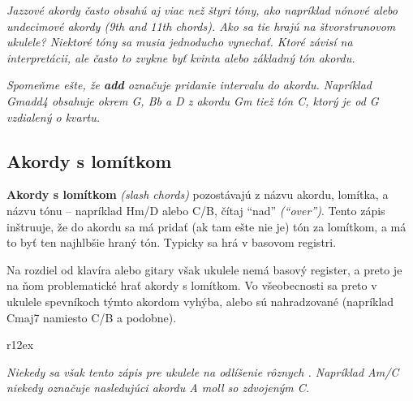 \bigskip

\textit{%
Jazzové akordy často obsahú aj viac než štyri tóny, ako napríklad nónové alebo undecimové akordy (9th and 11th chords). Ako sa tie hrajú na štvorstrunovom ukulele? Niektoré tóny sa musia jednoducho vynechať. Ktoré závisí na interpretácii, ale často to zvykne byť kvinta alebo základný tón akordu.
}

\textit{%
Spomeňme ešte, že \textbf{add} označuje pridanie intervalu do akordu. Napríklad Gmadd4 obsahuje okrem G, Bb a D z akordu Gm tiež tón C, ktorý je od G vzdialený o kvartu.
}

\subsection*{Akordy s lomítkom}

\textbf{Akordy s lomítkom} \textit{(slash chords)} pozostávajú z názvu akordu, lomítka, a názvu tónu
-- napríklad Hm/D alebo C/B, čítaj ``nad'' \textit{(``over'')}. Tento zápis inštruuje, že do akordu
sa má pridať (ak tam ešte nie je) tón za lomítkom, a má to byť ten najhlbšie hraný tón. Typicky sa hrá v basovom registri.

Na rozdiel od klavíra alebo gitary však ukulele nemá basový register, a preto je na ňom problematické
hrať akordy s lomítkom. Vo všeobecnosti sa preto v ukulele spevníkoch týmto akordom vyhýba,
alebo sú nahradzované (napríklad Cmaj7 namiesto C/B a podobne).

\begin{wrapfigure}{r}{12ex}
\begin{center}
\vspace{-5ex}
\smaller
\smaller
{}
\end{center}
\end{wrapfigure}
\textit{%
Niekedy sa však tento zápis pre ukulele  na odlíšenie rôznych .
Napríklad Am/C niekedy označuje nasledujúci  akordu A moll so zdvojeným C.
}

\endgroup